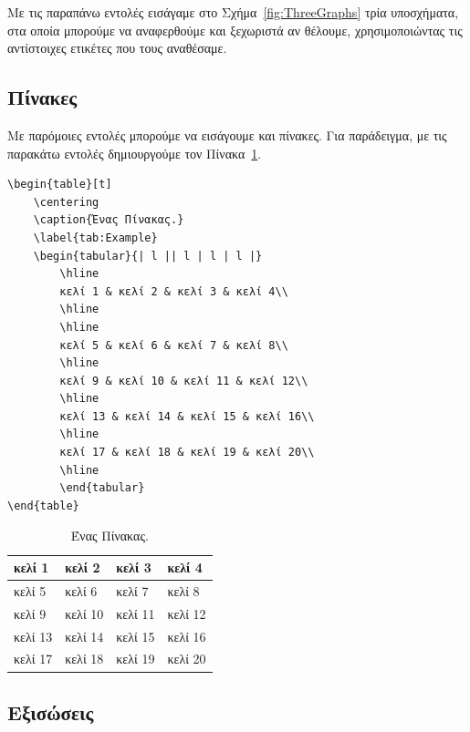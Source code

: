 Με τις παραπάνω εντολές εισάγαμε στο Σχήμα~\ref{fig:ThreeGraphs} τρία υποσχήματα, στα οποία μπορούμε να αναφερθούμε και ξεχωριστά αν θέλουμε, χρησιμοποιώντας τις αντίστοιχες ετικέτες που τους αναθέσαμε.


\subsection{Πίνακες}
\label{subsec:Tables}

Με παρόμοιες εντολές μπορούμε να εισάγουμε και πίνακες.
Για παράδειγμα, με τις παρακάτω εντολές δημιουργούμε τον Πίνακα~\ref{tab:Example}.

\begin{verbatim}
\begin{table}[t]
    \centering
    \caption{Ένας Πίνακας.}
    \label{tab:Example}
    \begin{tabular}{| l || l | l | l |}
        \hline
        κελί 1 & κελί 2 & κελί 3 & κελί 4\\
        \hline
        \hline
        κελί 5 & κελί 6 & κελί 7 & κελί 8\\
        \hline
        κελί 9 & κελί 10 & κελί 11 & κελί 12\\
        \hline
        κελί 13 & κελί 14 & κελί 15 & κελί 16\\
        \hline
        κελί 17 & κελί 18 & κελί 19 & κελί 20\\
        \hline
        \end{tabular}
\end{table}
\end{verbatim}

\begin{table}[t]
	\centering
	\caption{Ένας Πίνακας.}
	\label{tab:Example}
	\begin{tabular}{| l || l | l | l |}
		\hline
		κελί 1 & κελί 2 & κελί 3 & κελί 4\\
		\hline
		\hline
		κελί 5 & κελί 6 & κελί 7 & κελί 8\\
		\hline
		κελί 9 & κελί 10 & κελί 11 & κελί 12\\
		\hline
		κελί 13 & κελί 14 & κελί 15 & κελί 16\\
		\hline
		κελί 17 & κελί 18 & κελί 19 & κελί 20\\
		\hline
	\end{tabular}
\end{table}


\subsection{Εξισώσεις}
\label{subsec:Equations}

